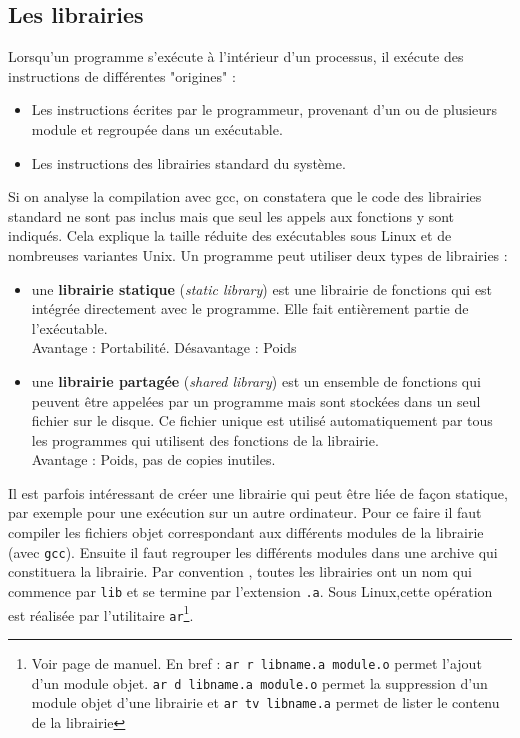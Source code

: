 \subsection{Les librairies}
Lorsqu'un programme s'exécute à l'intérieur d'un processus, il exécute des instructions de différentes "origines" :
\begin{itemize}
  \item Les instructions écrites par le programmeur, provenant d'un ou de plusieurs module et regroupée dans un exécutable.
  \item Les instructions des librairies standard du système.
\end{itemize}
Si on analyse la compilation avec gcc, on constatera que le code des librairies standard ne sont pas inclus mais que seul les appels aux fonctions y sont indiqués.
Cela explique la taille réduite des exécutables sous Linux et de nombreuses variantes Unix.
Un programme peut utiliser deux types de librairies :
\begin{itemize}
  \item une \textbf{librairie statique} (\textit{static library}) est une librairie de fonctions qui est intégrée directement avec le programme.
    Elle fait entièrement partie de l'exécutable. \\
    Avantage : Portabilité. Désavantage : Poids
  \item une \textbf{librairie partagée} (\textit{shared library}) est un ensemble de fonctions qui peuvent être appelées par un programme mais sont stockées dans un seul fichier sur le disque.
    Ce fichier unique est utilisé automatiquement par tous les programmes qui utilisent des fonctions de la librairie.\\
    Avantage : Poids, pas de copies inutiles.
\end{itemize}

Il est parfois intéressant de créer une librairie qui peut être liée de façon statique, par exemple pour une exécution sur un autre ordinateur. Pour ce faire il faut compiler les fichiers objet correspondant aux différents modules de la librairie (avec \texttt{gcc}). Ensuite il faut regrouper les différents modules dans une archive qui constituera la librairie. Par convention , toutes les librairies ont un nom qui commence par \texttt{lib} et se termine par l'extension \texttt{.a}. Sous Linux,cette opération est réalisée par l'utilitaire \texttt{ar}\footnote{Voir page de manuel. En bref : \texttt{ar r libname.a module.o} permet l'ajout d'un module objet. \texttt{ar d libname.a module.o} permet la suppression d'un module objet d'une librairie et \texttt{ar tv libname.a} permet de lister le contenu de la librairie}.

